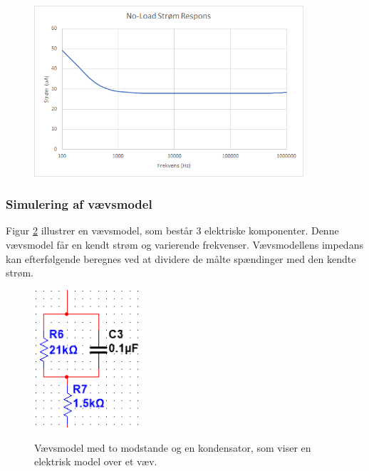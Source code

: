 \begin{figure}[H]
\centering
\includegraphics[width=10cm]{Figure/testopstilling1multisimnoloadgraf}
\label{fig:testopstilling1multisimnoloadgraf}
\end{figure}

\pagebreak
\subsubsection{Simulering af vævsmodel}
Figur \ref{fig:testopstilling1multisimvaevs} illustrer en vævsmodel, som består 3 elektriske komponenter. Denne vævsmodel får en kendt strøm og varierende frekvenser. Vævsmodellens impedans kan efterfølgende beregnes ved at dividere de målte spændinger med den kendte strøm. 


\begin{figure}[H]
\centering
{\includegraphics[width=4cm]
{Figure/testopstilling1multisimvaevs}}
\caption{Vævsmodel med to modstande og en kondensator, som viser en elektrisk model over et væv.}
\label{fig:testopstilling1multisimvaevs}
\end{figure}




